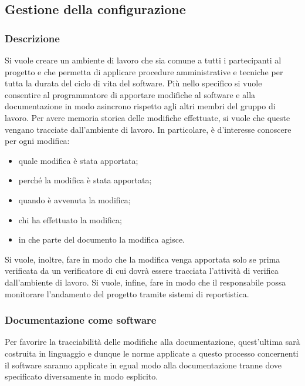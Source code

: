 \subsection{Gestione della configurazione}
    \subsubsection{Descrizione}
    Si vuole creare un ambiente di lavoro che sia comune a tutti i partecipanti al progetto e che permetta di applicare procedure amministrative e tecniche per tutta la durata del ciclo di vita del software. Più nello specifico si vuole consentire al programmatore di apportare modifiche al software e alla documentazione in modo asincrono rispetto agli altri membri del gruppo di lavoro. Per avere memoria storica delle modifiche effettuate, si vuole che queste vengano tracciate dall'ambiente di lavoro. In particolare, è d'interesse conoscere per ogni modifica:
    \begin{itemize}
        \item quale modifica è stata apportata;
        \item perché la modifica è stata apportata;
        \item quando è avvenuta la modifica;
        \item chi ha effettuato la modifica;
        \item in che parte del documento la modifica agisce.
    \end{itemize}
    Si vuole, inoltre, fare in modo che la modifica venga apportata solo se prima verificata da un verificatore di cui dovrà essere tracciata l'attività di verifica dall'ambiente di lavoro. Si vuole, infine, fare in modo che il responsabile possa monitorare l'andamento del progetto tramite sistemi di reportistica.

    \subsubsection{Documentazione come software}
    Per favorire la tracciabilità delle modifiche alla documentazione, quest'ultima sarà costruita in linguaggio \glock{\LaTeX} e dunque le norme applicate a questo processo concernenti il software saranno applicate in egual modo alla documentazione tranne dove specificato diversamente in modo esplicito.

